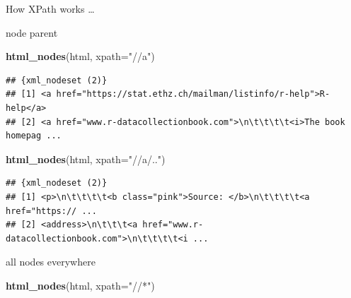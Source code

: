 \documentclass[ignorenonframetext,]{beamer}
\newenvironment{Shaded}{\begin{snugshade}}{\end{snugshade}}
\newcommand{\KeywordTok}[1]{\textcolor[rgb]{0.13,0.29,0.53}{\textbf{{#1}}}}
\newcommand{\DataTypeTok}[1]{\textcolor[rgb]{0.13,0.29,0.53}{{#1}}}
\newcommand{\StringTok}[1]{\textcolor[rgb]{0.31,0.60,0.02}{{#1}}}
\newcommand{\NormalTok}[1]{{#1}}
\begin{document}
\begin{frame}[fragile]{How XPath works \ldots{}}
\begin{block}{node parent}
\begin{Shaded}
\begin{Highlighting}[]
\KeywordTok{html_nodes}\NormalTok{(html, }\DataTypeTok{xpath=}\StringTok{"//a"}\NormalTok{)}
\end{Highlighting}
\end{Shaded}

\begin{verbatim}
## {xml_nodeset (2)}
## [1] <a href="https://stat.ethz.ch/mailman/listinfo/r-help">R-help</a>
## [2] <a href="www.r-datacollectionbook.com">\n\t\t\t\t<i>The book homepag ...
\end{verbatim}

\begin{Shaded}
\begin{Highlighting}[]
\KeywordTok{html_nodes}\NormalTok{(html, }\DataTypeTok{xpath=}\StringTok{"//a/.."}\NormalTok{)}
\end{Highlighting}
\end{Shaded}

\begin{verbatim}
## {xml_nodeset (2)}
## [1] <p>\n\t\t\t\t<b class="pink">Source: </b>\n\t\t\t\t<a href="https:// ...
## [2] <address>\n\t\t\t<a href="www.r-datacollectionbook.com">\n\t\t\t\t<i ...
\end{verbatim}

\end{block}

\begin{block}{all nodes everywhere}

\begin{Shaded}
\begin{Highlighting}[]
\KeywordTok{html_nodes}\NormalTok{(html, }\DataTypeTok{xpath=}\StringTok{"//*"}\NormalTok{)}
\end{Highlighting}
\end{Shaded}


\end{block}
\end{frame}
\end{document}
